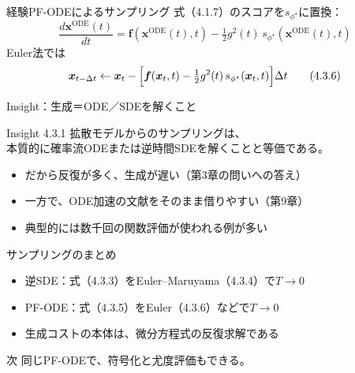\asmain
\begin{frame}{経験PF-ODEによるサンプリング}
    式（4.1.7）のスコアを$s_{\phi^\star}$に置換：
    \[
        \frac{d\bm{x}^{\mathrm{ODE}}(t)}{dt}
        =
        \bm{f}(\bm{x}^{\mathrm{ODE}}(t),t)
        -
        \tfrac12 g^{2}(t)\,
        s_{\phi^\star}(\bm{x}^{\mathrm{ODE}}(t),t)
        \tag{4.3.5}
    \]
    Euler法では
    \[
        \bm{x}_{t-\Delta t}
        \leftarrow
        \bm{x}_t
        -
        \Bigl[
        \bm{f}(\bm{x}_t,t)
        -
        \tfrac12 g^{2}(t)\,s_{\phi^\star}(\bm{x}_t,t)
        \Bigr]\Delta t
        \tag{4.3.6}
    \]
\end{frame}
\asmain
\begin{frame}{Insight：生成＝ODE／SDEを解くこと}
    \begin{block}{Insight 4.3.1}
        拡散モデルからのサンプリングは、\\
        本質的に確率流ODEまたは逆時間SDEを解くことと等価である。
    \end{block}
    \begin{itemize}
        \item だから反復が多く、生成が遅い（第3章の問いへの答え）
        \item 一方で、ODE加速の文献をそのまま借りやすい（第9章）
        \item 典型的には数千回の関数評価が使われる例が多い
    \end{itemize}
\end{frame}
\asmain
\begin{frame}{サンプリングのまとめ}
    \begin{itemize}
        \item 逆SDE：式（4.3.3）をEuler--Maruyama（4.3.4）で$T\to 0$
        \item PF-ODE：式（4.3.5）をEuler（4.3.6）などで$T\to 0$
        \item 生成コストの本体は、微分方程式の反復求解である
    \end{itemize}
    \begin{block}{次}
        同じPF-ODEで、符号化と尤度評価もできる。
    \end{block}
\end{frame}
